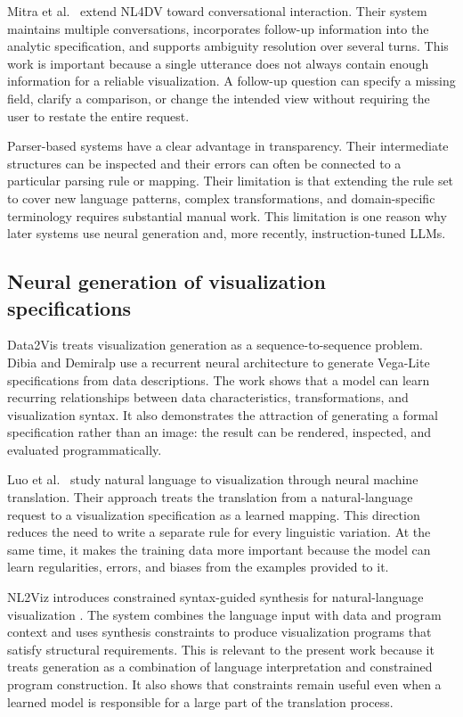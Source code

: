 Mitra et al.~\cite{mitra2022conversational} extend NL4DV toward conversational interaction. Their system maintains multiple conversations, incorporates follow-up information into the analytic specification, and supports ambiguity resolution over several turns. This work is important because a single utterance does not always contain enough information for a reliable visualization. A follow-up question can specify a missing field, clarify a comparison, or change the intended view without requiring the user to restate the entire request.

Parser-based systems have a clear advantage in transparency. Their intermediate structures can be inspected and their errors can often be connected to a particular parsing rule or mapping. Their limitation is that extending the rule set to cover new language patterns, complex transformations, and domain-specific terminology requires substantial manual work. This limitation is one reason why later systems use neural generation and, more recently, instruction-tuned LLMs.

\subsection{Neural generation of visualization specifications}

Data2Vis treats visualization generation as a sequence-to-sequence problem. Dibia and Demiralp \cite{dibia2019data2vis} use a recurrent neural architecture to generate Vega-Lite specifications from data descriptions. The work shows that a model can learn recurring relationships between data characteristics, transformations, and visualization syntax. It also demonstrates the attraction of generating a formal specification rather than an image: the result can be rendered, inspected, and evaluated programmatically.

Luo et al.~\cite{luo2022nmt} study natural language to visualization through neural machine translation. Their approach treats the translation from a natural-language request to a visualization specification as a learned mapping. This direction reduces the need to write a separate rule for every linguistic variation. At the same time, it makes the training data more important because the model can learn regularities, errors, and biases from the examples provided to it.

NL2Viz introduces constrained syntax-guided synthesis for natural-language visualization \cite{wu2022nl2viz}. The system combines the language input with data and program context and uses synthesis constraints to produce visualization programs that satisfy structural requirements. This is relevant to the present work because it treats generation as a combination of language interpretation and constrained program construction. It also shows that constraints remain useful even when a learned model is responsible for a large part of the translation process.

